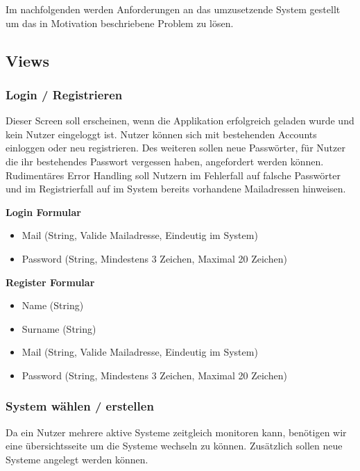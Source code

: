 Im nachfolgenden werden Anforderungen an das umzusetzende System gestellt um das in Motivation beschriebene Problem zu lösen.

\subsection{Views}
\subsubsection{Login / Registrieren}

Dieser Screen soll erscheinen, wenn die Applikation erfolgreich geladen wurde und kein Nutzer eingeloggt ist.
Nutzer können sich mit bestehenden Accounts einloggen oder neu registrieren.
Des weiteren sollen neue Passwörter, für Nutzer die ihr bestehendes Passwort vergessen haben, angefordert werden können.
Rudimentäres Error Handling soll Nutzern im Fehlerfall auf falsche Passwörter und im Registrierfall auf
im System bereits vorhandene Mailadressen hinweisen.

\vspace{1cm}




\textbf{Login Formular}
\begin{itemize}
\item Mail (String, Valide Mailadresse, Eindeutig im System)
\item Password (String, Mindestens 3 Zeichen, Maximal 20 Zeichen)
\end{itemize}

\textbf{Register Formular}
\begin{itemize}
\item Name (String)
\item Surname (String)
\item Mail (String, Valide Mailadresse, Eindeutig im System)
\item Password (String, Mindestens 3 Zeichen, Maximal 20 Zeichen)
\end{itemize}



\vspace{1cm}

\subsubsection{System wählen / erstellen}

Da ein Nutzer mehrere aktive Systeme zeitgleich monitoren kann, benötigen wir eine übersichtsseite
um die Systeme wechseln zu können. Zusätzlich sollen neue Systeme angelegt werden können.

